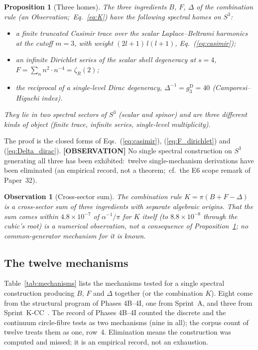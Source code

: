 \documentclass[aps,prl,twocolumn,superscriptaddress]{revtex4-2}
\newtheorem{observation}{Observation}
\newtheorem{proposition}{Proposition}
\begin{document}
\begin{proposition}[Three homes]\label{thm:three_homes}
The three ingredients $B$, $F$, $\Delta$ of the combination rule
(an Observation;\ Eq.~\eqref{eq:K}) have the following spectral homes on
$S^3$:
\begin{itemize}
  \item[$(B)$] a finite truncated Casimir trace over the scalar
    Laplace--Beltrami harmonics at the cutoff $m = 3$, with weight
    $(2l+1)\,l(l+1)$, Eq.~(\ref{eq:casimir});
  \item[$(F)$] an infinite Dirichlet series of the scalar shell
    degeneracy at $s = 4$, $F = \sum_{n} n^2 \cdot n^{-4} = \zeta_R(2)$;
  \item[$(\Delta)$] the reciprocal of a single-level Dirac degeneracy,
    $\Delta^{-1} = g_3^{\mathrm{D}} = 40$ (Camporesi--Higuchi index).
\end{itemize}
They lie in two spectral sectors of $S^3$ (scalar and spinor) and are
three different kinds of object (finite trace, infinite series,
single-level multiplicity).
\end{proposition}
\noindent The proof is the closed forms of
Eqs.~(\ref{eq:casimir}), (\ref{eq:F_dirichlet}) and (\ref{eq:Delta_dirac}).
\noindent \textbf{[OBSERVATION]} No single spectral construction on $S^3$ generating all
three has been exhibited:\ twelve single-mechanism derivations have been
eliminated (an empirical record, not a theorem;\ cf.\ the E6 scope
remark of Paper~32).

\begin{observation}[Cross-sector sum]\label{obs:cross_sector}
The combination rule $K = \pi(B + F - \Delta)$ is a
\emph{cross-sector sum} of three ingredients with separate algebraic
origins. That the sum comes within $4.8\times 10^{-7}$ of
$\alpha^{-1}/\pi$ for $K$ itself (to $8.8\times 10^{-8}$ through the
cubic's root) is a numerical observation, not a consequence of
Proposition~\ref{thm:three_homes}; no common-generator mechanism for it
is known.
\end{observation}

\subsection{The twelve mechanisms}

Table~\ref{tab:mechanisms} lists the mechanisms tested for a single
spectral construction producing $B$, $F$ and $\Delta$ together (or the
combination $K$). Eight come from the structural program of Phases
4B--4I, one from Sprint~A, and three from Sprint~K-CC~\cite{alpha_program_record,alpha_sprint_a_memo}.
The record of Phases 4B--4I counted the discrete and the continuum
circle-fibre tests as two mechanisms (nine in all); the corpus count of
twelve treats them as one, row~4. Elimination means the construction
was computed and missed; it is an empirical record, not an exhaustion.
\end{document}
